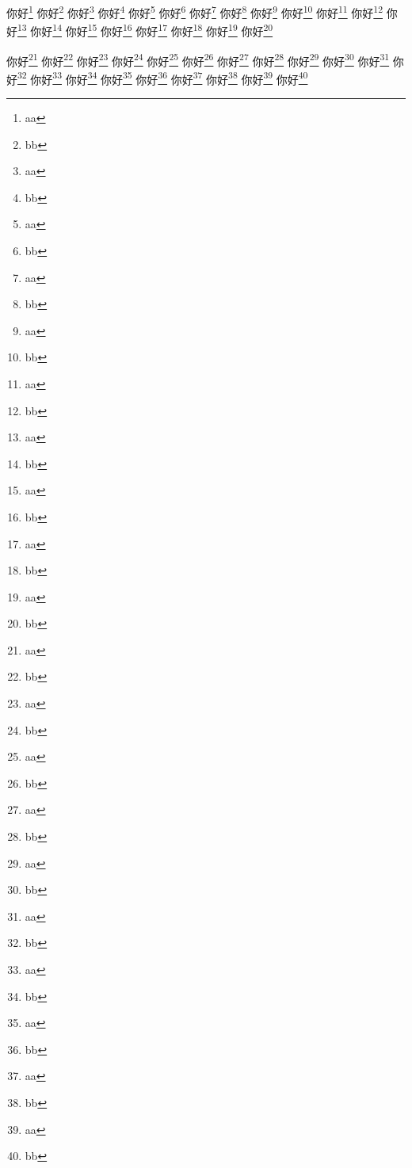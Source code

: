 \documentclass{ctexart}
\begin{document}
你好\footnote{aa} 你好\footnote{bb}
你好\footnote{aa} 你好\footnote{bb}
你好\footnote{aa} 你好\footnote{bb}
你好\footnote{aa} 你好\footnote{bb}
你好\footnote{aa} 你好\footnote{bb}
你好\footnote{aa} 你好\footnote{bb}
你好\footnote{aa} 你好\footnote{bb}
你好\footnote{aa} 你好\footnote{bb}
你好\footnote{aa} 你好\footnote{bb}
你好\footnote{aa} 你好\footnote{bb}

你好\footnote{aa} 你好\footnote{bb}
你好\footnote{aa} 你好\footnote{bb}
你好\footnote{aa} 你好\footnote{bb}
你好\footnote{aa} 你好\footnote{bb}
你好\footnote{aa} 你好\footnote{bb}
你好\footnote{aa} 你好\footnote{bb}
你好\footnote{aa} 你好\footnote{bb}
你好\footnote{aa} 你好\footnote{bb}
你好\footnote{aa} 你好\footnote{bb}
你好\footnote{aa} 你好\footnote{bb}
\end{document}
